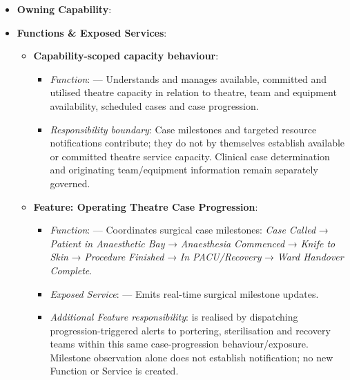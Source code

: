 \begin{itemize}

\item
\textbf{Owning Capability}: \texttt{}



\item
\textbf{Functions \& Exposed Services}:


\begin{itemize}

\item
\textbf{Capability-scoped capacity behaviour}:


\begin{itemize}

\item
\emph{Function}: \texttt{} — Understands and manages available, committed and utilised theatre capacity in relation to theatre, team and equipment availability, scheduled cases and case progression.



\item
\emph{Responsibility boundary}: Case milestones and targeted resource notifications contribute; they do not by themselves establish available or committed theatre service capacity. Clinical case determination and originating team/\allowbreak{}equipment information remain separately governed.



\end{itemize}


\item
\textbf{Feature: Operating Theatre Case Progression}:


\begin{itemize}

\item
\emph{Function}: \texttt{} — Coordinates surgical case milestones: \emph{Case Called} → \emph{Patient in Anaesthetic Bay} → \emph{Anaesthesia Commenced} → \emph{Knife to Skin} → \emph{Procedure Finished} → \emph{In PACU/\allowbreak{}Recovery} → \emph{Ward Handover Complete}.



\item
\emph{Exposed Service}: \texttt{} — Emits real-time surgical milestone updates.



\item
\emph{Additional Feature responsibility}: \texttt{} is realised by dispatching progression-triggered alerts to portering, sterilisation and recovery teams within this same case-progression behaviour/\allowbreak{}exposure. Milestone observation alone does not establish notification; no new Function or Service is created.




\end{itemize}
\end{itemize}
\end{itemize}
